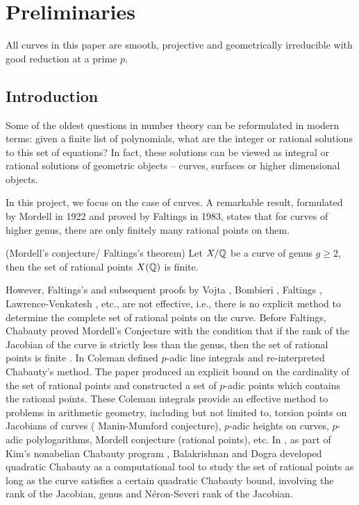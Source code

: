 \chapter{Preliminaries}

All curves in this paper are smooth, projective and geometrically irreducible with good reduction at a prime $p$.

\section{Introduction}

Some of the oldest questions in number theory can be reformulated in modern terms: given a finite list of polynomials, what are the integer or rational solutions to this set of equations? In fact, these solutions can be viewed as integral or rational solutions of geometric objects -- curves, surfaces or higher dimensional objects.

In this project, we focus on the case of curves. A remarkable result, formulated by Mordell in 1922 and proved by Faltings in 1983, states that for curves of higher genus, there are only finitely many rational points on them. 

\begin{theorem}{(Mordell's conjecture/ Faltings's theorem)} Let $X/\mathbb{Q}$ be a curve of genus $g \geq 2$, then the set of rational points $X(\mathbb{Q})$ is finite.
\end{theorem}

However, Faltings's \cite{faltings} and subsequent proofs by Vojta \cite{vojta}, Bombieri \cite{bombieri}, Faltings \cite{faltingsnew}, Lawrence-Venkatesh \cite{lawrencevenkatesh}, etc., are not effective, i.e., there is no explicit method to determine the complete set of rational points on the curve. Before Faltings, Chabauty proved Mordell's Conjecture with the condition that if the rank of the Jacobian of the curve is strictly less than the genus, then the set of rational points is finite \cite{chabauty}. In \cite{Coleman2,Coleman3} Coleman defined $p$-adic line integrals and re-interpreted Chabauty's method. The paper produced an explicit bound on the cardinality of the set of rational points and constructed a set of $p$-adic points which contains the rational points. These Coleman integrals provide an effective method to problems in arithmetic geometry, including but not limited to, torsion points on Jacobians of curves ( Manin-Mumford conjecture), $p$-adic heights on curves, $p$-adic polylogarithms, Mordell conjecture (rational points), etc. In \cite{BD1,BD2}, as part of Kim's nonabelian Chabauty program \cite{kim05,kim09}, Balakrishnan and Dogra developed quadratic Chabauty as a computational tool to study the set of rational points as long as the curve satisfies a certain quadratic Chabauty bound, involving the rank of the Jacobian, genus and N\'{e}ron-Severi rank of the Jacobian.

